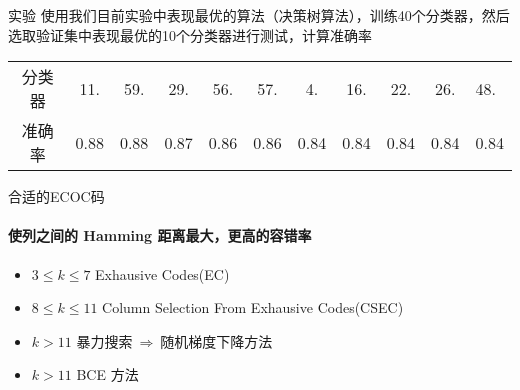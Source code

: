 \documentclass[aspectratio=169, 13pt,compress]{beamer}
\begin{document}
\begin{frame}{实验}
使用我们目前实验中表现最优的算法（决策树算法），训练40个分类器，然后选取验证集中表现最优的10个分类器进行测试，计算准确率
 \vspace{.8cm}
\begin{table}[]
\begin{tabular}{c|cccccccccl}
\cline{1-11}
分类器 & 11.  & 59.  & 29.  & 56.  & 57.  & 4.   & 16.  & 22.  & 26.  & 48.  \\ \cline{1-11}
准确率 & 0.88 & 0.88 & 0.87 & 0.86 & 0.86 & 0.84 & 0.84 & 0.84 & 0.84 & 0.84 \\ \cline{1-11}
\end{tabular}
\end{table}
 \vspace{.8cm}
\end{frame}{}

\begin{frame}{合适的ECOC码}
\framesubtitle{使列之间的 Hamming 距离最大，更高的容错率}
    \begin{itemize}
        \item  $ 3\leq k \leq 7$  Exhausive Codes(EC)
        \item $ 8 \leq k \leq 11$ Column Selection From Exhausive Codes(CSEC)
        \item $k > 11$ 暴力搜索$~ \Longrightarrow~$随机梯度下降方法
        \item $k>11$ BCE 方法
    \end{itemize}
\end{frame}
\end{document}
